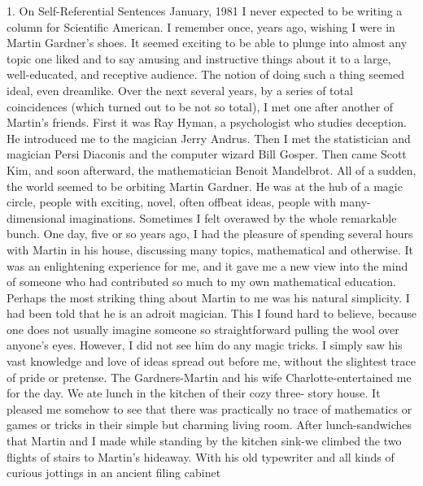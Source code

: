 1. On Self-Referential Sentences January, 1981 
I never expected to be writing a column for Scientific American. I remember once, years ago, wishing I were in Martin Gardner's shoes. It seemed exciting to be able to plunge into almost any topic one liked and to say amusing and instructive things about it to a large, well-educated, and receptive audience. The notion of doing such a thing seemed ideal, even dreamlike. Over the next several years, by a series of total coincidences (which turned out to be not so total), I met one after another of Martin's friends. First it was Ray Hyman, a psychologist who studies deception. He introduced me to the magician Jerry Andrus. Then I met the statistician and magician Persi Diaconis and the computer wizard Bill Gosper. Then came Scott Kim, and soon afterward, the mathematician Benoit Mandelbrot. All of a sudden, the world seemed to be orbiting Martin Gardner. He was at the hub of a magic circle, people with exciting, novel, often offbeat ideas, people with many-dimensional imaginations. Sometimes I felt overawed by the whole remarkable bunch. One day, five or so years ago, I had the pleasure of spending several hours with Martin in his house, discussing many topics, mathematical and otherwise. It was an enlightening experience for me, and it gave me a new view into the mind of someone who had contributed so much to my own mathematical education. Perhaps the most striking thing about Martin to me was his natural simplicity. I had been told that he is an adroit magician. This I found hard to believe, because one does not usually imagine someone so straightforward pulling the wool over anyone's eyes. However, I did not see him do any magic tricks. I simply saw his vast knowledge and love of ideas spread out before me, without the slightest trace of pride or pretense. The Gardners-Martin and his wife Charlotte-entertained me for the day. We ate lunch in the kitchen of their cozy three- story house. It pleased me somehow to see that there was practically no trace of mathematics or games or tricks in their simple but charming living room. After lunch-sandwiches that Martin and I made while standing by the kitchen sink-we climbed the two flights of stairs to Martin's hideaway. With his old typewriter and all kinds of curious jottings in an ancient filing cabinet 



